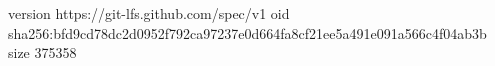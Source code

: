 version https://git-lfs.github.com/spec/v1
oid sha256:bfd9cd78dc2d0952f792ca97237e0d664fa8cf21ee5a491e091a566c4f04ab3b
size 375358
